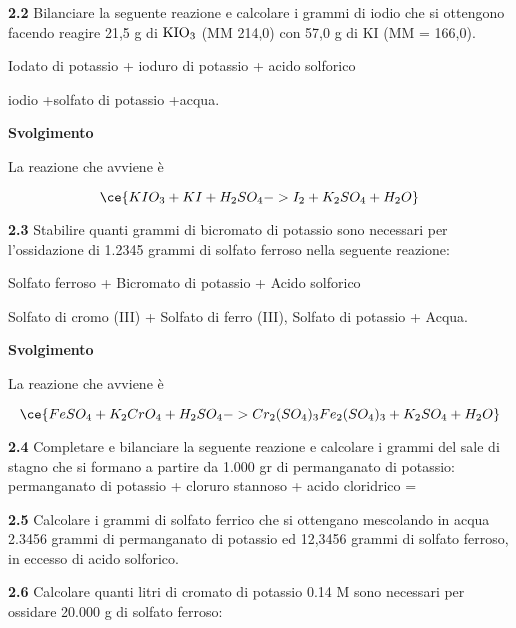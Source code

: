 \vspace{0.2cm}\textbf{2.2} Bilanciare la  seguente reazione e calcolare i grammi di iodio che si ottengono facendo reagire 21,5 g di $\rm KIO_3$ (MM 214,0) con 57,0 g di KI (MM = 166,0).

\vspace{0.2cm}
\begin{center}Iodato di potassio + ioduro di potassio + acido solforico \ce{->}

\ce{->}iodio +solfato di potassio +acqua. 
\end{center}

\large\textbf{Svolgimento}\normalsize

\vspace{0.2cm}La reazione che avviene è

$$\ce{KIO_3 + KI + H_2SO_4 -> I_2 + K_2SO_4 + H_2O}$$

\vspace{0.2cm}\textbf{2.3} Stabilire quanti grammi di bicromato di potassio sono necessari per l’ossidazione di 1.2345 grammi di solfato ferroso nella seguente reazione:

\begin{center}
    Solfato ferroso + Bicromato di potassio + Acido solforico \ce{->}
    
    \ce{->} Solfato di cromo (III) + Solfato di ferro (III), Solfato di potassio + Acqua.   
\end{center}

\large\textbf{Svolgimento}\normalsize

\vspace{0.2cm}La reazione che avviene è

$$\ce{FeSO_4 + K_2CrO_4 + H_2SO_4 -> Cr_2(SO_4)_3 Fe_2(SO_4)_3 + K_2SO_4 + H_2O}$$

\vspace{0.2cm}\textbf{2.4} Completare e bilanciare la seguente reazione e calcolare i grammi del sale di stagno che si formano a partire da 1.000 gr di permanganato di potassio: 
permanganato di potassio + cloruro stannoso + acido cloridrico =

\vspace{0.2cm}\textbf{2.5} Calcolare i grammi di solfato ferrico che si ottengano mescolando in acqua 2.3456 grammi di permanganato di potassio  ed 12,3456 grammi di solfato ferroso, in eccesso di acido solforico.

\vspace{0.2cm}\textbf{2.6} Calcolare quanti litri di cromato di potassio 0.14 M sono necessari per ossidare 20.000 g di solfato ferroso:
\begin{center}

\end{center}

